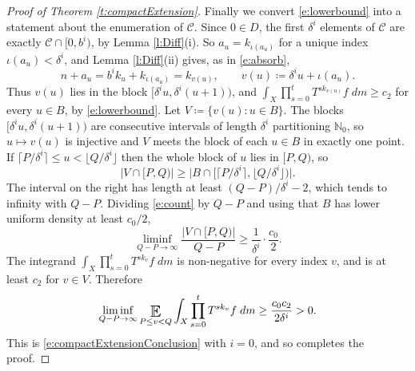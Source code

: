 \begin{proof}[Proof of Theorem \ref{t:compactExtension}]
Finally we convert \eqref{e:lowerbound} into a statement about the enumeration of $\mathcal C$.  
Since $0 \in D$, the first $\delta ^{i}$ elements of $\mathcal C$ are exactly $\mathcal C \cap [0,b ^{i})$, by Lemma \ref{l:Diff}(i).  
So $a_u = k _{\iota (a_u)}$ for a unique index $\iota (a_u) < \delta ^{i}$, and Lemma \ref{l:Diff}(ii) gives, as in \eqref{e:absorb}, 
\begin{equation}
n + a_u = b ^{i}k_u + k _{\iota (a_u)} = k _{v(u)} , \qquad v(u) \coloneqq \delta ^{i}u + \iota (a_u) . 
\end{equation}
Thus $v(u)$ lies in the block $[\delta ^{i}u , \delta ^{i}(u+1))$, and 
$\int_X \prod _{s=0}^{t} T ^{s k_{v(u)}}f \;dm \geq c_2$ for every $u \in B$, by \eqref{e:lowerbound}.  
Let $V \coloneqq \{ v(u) \colon u \in B\}$.  The blocks $[\delta ^{i}u, \delta ^{i}(u+1))$ are consecutive intervals of length $\delta ^{i}$ partitioning $\mathbb N_0$, 
so $u \mapsto v(u)$ is injective and $V$ meets the block of each $u \in B$ in exactly one point.  
If $\lceil P/\delta ^{i}\rceil \leq u < \lfloor Q/ \delta ^{i} \rfloor$ then the whole block of $u$ lies in $[P,Q)$, so 
\begin{equation} \label{e:count}
\bigl\lvert V \cap [P,Q) \bigr\rvert 
\geq \bigl\lvert B \cap [ \lceil P/\delta ^{i}\rceil , \lfloor Q/ \delta ^{i} \rfloor ) \bigr\rvert . 
\end{equation}
The interval on the right has length at least $(Q-P)/ \delta ^{i} -2$, which tends to infinity with $Q-P$.  
Dividing \eqref{e:count} by $Q-P$ and using that $B$ has lower uniform density at least $c_0/2$, 
\begin{equation}
\liminf_{Q-P\to\infty} \frac{\lvert V \cap [P,Q)\rvert}{Q-P} \geq \frac{1}{\delta ^{i}}\cdot \frac {c_0}2 . 
\end{equation}
The integrand $\int_X \prod _{s=0}^{t} T ^{s k_{v}}f \;dm$ is non-negative for every index $v$, and is at least $c_2$ for $v \in V$.  Therefore 
\begin{equation}
\liminf_{Q-P\to\infty} \Expectation_{P \leq v <Q} \int_X \prod _{s=0}^{t} T ^{s k_{v}}f \;dm 
\geq \frac{c_0c_2}{2 \delta ^{i}} >0 . 
\end{equation}
This is \eqref{e:compactExtensionConclusion} with $i=0$, and so completes the proof. 
\end{proof}


